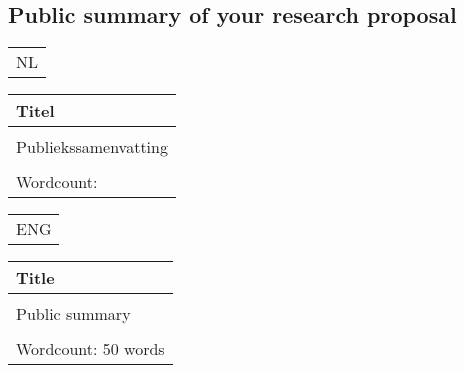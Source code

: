 \subsection{Public summary of your research proposal}\label{sec:popsummary}


\begin{center}
    \renewcommand{\arraystretch}{1.2}
    \normalsize
    \begin{tabular}{m{140mm}}
        NL\\
    \end{tabular}
    \begin{tabular}{|m{140mm}|}
        \hline
        \textbf{Titel}\\
        \hline
        \textit{} \\
        \hline
        Publiekssamenvatting \\
        \\
        \hline
        Wordcount: \\
        \hline
    \end{tabular}
\end{center}

\vspace{1\baselineskip}

\begin{center}
    \renewcommand{\arraystretch}{1.2}
    \normalsize
    \begin{tabular}{m{140mm}}
        ENG\\
    \end{tabular}
    \begin{tabular}{|m{140mm}|}
        \hline
        \textbf{Title}\\
        \hline
        \textit{} \\
        \hline
        Public summary \\
        \\
        \hline
        Wordcount: 50 words\\
        \hline
    \end{tabular}
\end{center}
